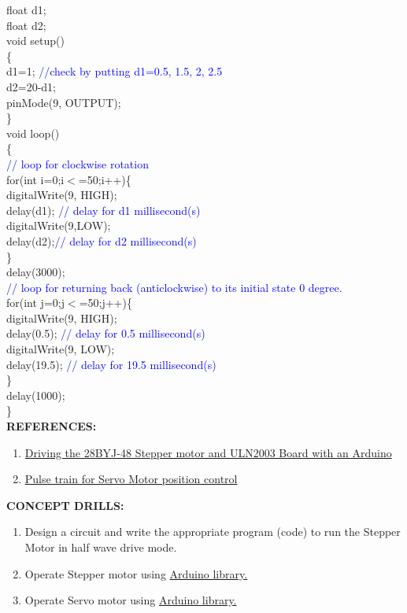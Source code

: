 \documentclass[12pt,a4paper]{article}
\begin{document}
\setlength{\parindent}{10eM}

float d1;\\
float d2;\\
void setup()\\
\{\\
   d1=1; \textcolor{blue}{//check by putting d1=0.5, 1.5, 2, 2.5}\\
   d2=20-d1; \\
   pinMode(9, OUTPUT);\\
\}\\
void loop()\\
\{\\
  \textcolor{blue}{ // loop for clockwise rotation}\\
   for(int i=0;i$<$=50;i++)\{\\
   digitalWrite(9, HIGH);\\
   delay(d1); \textcolor{blue}{// delay for d1 millisecond(s)}\\
   digitalWrite(9,LOW);\\
   delay(d2);\textcolor{blue}{// delay for d2 millisecond(s)}\\
  \}\\
   delay(3000);\\

  \textcolor{blue}{ // loop for returning back (anticlockwise) to its initial state 0 degree.}\\
   for(int j=0;j$<$=50;j++)\{\\
   digitalWrite(9, HIGH);\\
   delay(0.5);  \textcolor{blue}{// delay for 0.5 millisecond(s)}\\
   digitalWrite(9, LOW);\\
   delay(19.5); \textcolor{blue}{// delay for 19.5 millisecond(s)}\\
   \}\\
   delay(1000);\\
\}\\[21pt]
\setlength{\parindent}{0eM}
\textbf{\large REFERENCES:}
\vspace{-6mm}
\begin{enumerate}
\setlength\itemsep{-0.3em}
 \item  \href{https://www.seeedstudio.com/blog/2019/03/04/driving-a-28byj-48-stepper-motor-with-a-uln2003-driver-board-and-arduino/}{Driving the 28BYJ-48 Stepper motor and ULN2003 Board with an Arduino }
\item   \href{https://www.makerguides.com/servo-arduino-tutorial/}{Pulse train for Servo Motor position control}
\end{enumerate}

\textbf{\large CONCEPT DRILLS:}
\vspace{-6mm}
\begin{enumerate}
 \setlength\itemsep{-0.3em}
\item Design a circuit and write the appropriate program (code) to run the Stepper Motor in half wave drive mode.
\item Operate Stepper motor using \href{https://www.arduino.cc/en/reference/stepper}{Arduino library.}
\item Operate Servo motor using \href{https://www.arduino.cc/reference/en/libraries/servo/}{Arduino library.}
\end{enumerate}
\end{document}
